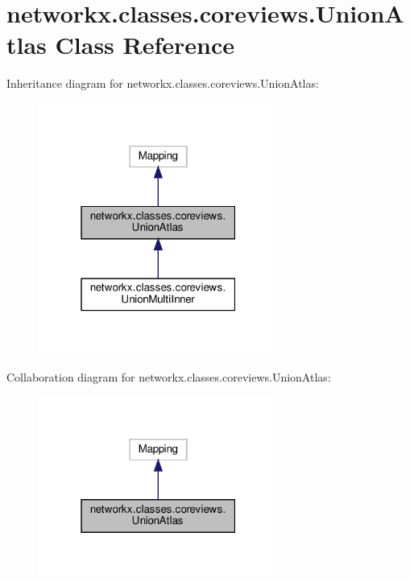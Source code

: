 \hypertarget{classnetworkx_1_1classes_1_1coreviews_1_1UnionAtlas}{}\section{networkx.\+classes.\+coreviews.\+Union\+Atlas Class Reference}
\label{classnetworkx_1_1classes_1_1coreviews_1_1UnionAtlas}


Inheritance diagram for networkx.\+classes.\+coreviews.\+Union\+Atlas\+:
\nopagebreak
\begin{figure}[H]
\begin{center}
\leavevmode
\includegraphics[width=223pt]{classnetworkx_1_1classes_1_1coreviews_1_1UnionAtlas__inherit__graph}
\end{center}
\end{figure}


Collaboration diagram for networkx.\+classes.\+coreviews.\+Union\+Atlas\+:
\nopagebreak
\begin{figure}[H]
\begin{center}
\leavevmode
\includegraphics[width=223pt]{classnetworkx_1_1classes_1_1coreviews_1_1UnionAtlas__coll__graph}
\end{center}
\end{figure}
